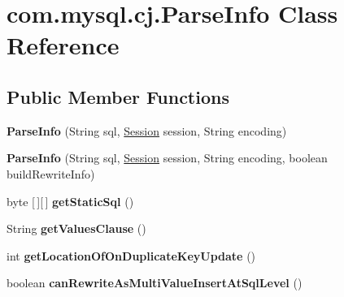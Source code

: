 \hypertarget{classcom_1_1mysql_1_1cj_1_1_parse_info}{}\section{com.\+mysql.\+cj.\+Parse\+Info Class Reference}
\label{classcom_1_1mysql_1_1cj_1_1_parse_info}
\subsection*{Public Member Functions}
\begin{DoxyCompactItemize}
\item 
\mbox{\label{classcom_1_1mysql_1_1cj_1_1_parse_info_a2ad9d4e1a851a9a83dd98fa5680b2582}} 
{\bfseries Parse\+Info} (String sql, \mbox{\hyperlink{interfacecom_1_1mysql_1_1cj_1_1_session}{Session}} session, String encoding)
\item 
\mbox{\label{classcom_1_1mysql_1_1cj_1_1_parse_info_a3d8041c18abed49b875e46d462787547}} 
{\bfseries Parse\+Info} (String sql, \mbox{\hyperlink{interfacecom_1_1mysql_1_1cj_1_1_session}{Session}} session, String encoding, boolean build\+Rewrite\+Info)
\item 
\mbox{\label{classcom_1_1mysql_1_1cj_1_1_parse_info_a7bcdc3fc9f3ba6ee10cbebd852ec7499}} 
byte \mbox{[}$\,$\mbox{]}\mbox{[}$\,$\mbox{]} {\bfseries get\+Static\+Sql} ()
\item 
\mbox{\label{classcom_1_1mysql_1_1cj_1_1_parse_info_ab4edc6aeb613cae7e4c882b28e760a02}} 
String {\bfseries get\+Values\+Clause} ()
\item 
\mbox{\label{classcom_1_1mysql_1_1cj_1_1_parse_info_a068d6757223b8e1aa1aae78d75201728}} 
int {\bfseries get\+Location\+Of\+On\+Duplicate\+Key\+Update} ()
\item 
\mbox{\label{classcom_1_1mysql_1_1cj_1_1_parse_info_ab74791d029e7a456e2b7d34f5dfd491f}} 
boolean {\bfseries can\+Rewrite\+As\+Multi\+Value\+Insert\+At\+Sql\+Level} ()
\item 
\mbox{\label{classcom_1_1mysql_1_1cj_1_1_parse_info_ac5edf580e4fabda26a81d7f2920491ed}} 

\end{DoxyCompactItemize}
